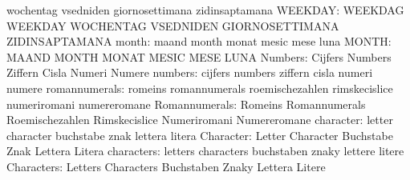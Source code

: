                                   wochentag                        vsedniden
                                  giornosettimana                  zidinsaptamana
                         WEEKDAY: WEEKDAG                          WEEKDAY
                                  WOCHENTAG                        VSEDNIDEN
                                  GIORNOSETTIMANA                  ZIDINSAPTAMANA
                           month: maand                            month
                                  monat                            mesic
                                  mese                             luna
                           MONTH: MAAND                            MONTH
                                  MONAT                            MESIC
                                  MESE                             LUNA
                         Numbers: Cijfers                          Numbers
                                  Ziffern                          Cisla
                                  Numeri                           Numere
                         numbers: cijfers                          numbers
                                  ziffern                          cisla
                                  numeri                           numere
                   romannumerals: romeins                          romannumerals
                                  roemischezahlen                  rimskecislice
                                  numeriromani                     numereromane
                   Romannumerals: Romeins                          Romannumerals
                                  Roemischezahlen                  Rimskecislice
                                  Numeriromani                     Numereromane
                       character: letter                           character
                                  buchstabe                        znak
                                  lettera                          litera
                       Character: Letter                           Character
                                  Buchstabe                        Znak
                                  Lettera                          Litera
                      characters: letters                          characters
                                  buchstaben                       znaky
                                  lettere                          litere
                      Characters: Letters                          Characters
                                  Buchstaben                       Znaky
                                  Lettera                          Litere
